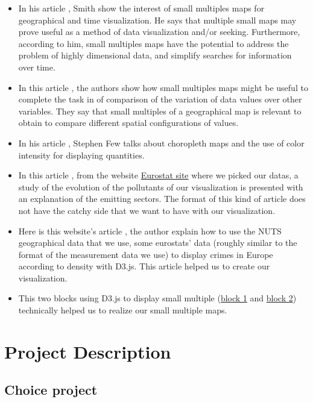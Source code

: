 \documentclass[preprint,journal]{vgtc}       %
\begin{document}
\begin{itemize}[leftmargin=*,parsep=0cm]
\item In his article \cite{Smith:2005:MSM}, Smith show the interest of small multiples maps for geographical and time visualization. He says that multiple small maps may prove useful as a method of data visualization and/or seeking. Furthermore, according to him, small multiples maps have the potential to address the problem of highly dimensional data, and simplify searches for information over time.


\item In this article \cite{Reimer:2011:SSM}, the authors show how small multiples maps might be useful to complete the task in of comparison of the variation of data values over other variables. They say that small multiples of a geographical map is relevant to obtain to compare different spatial configurations of values.

\item In his article \cite{Few:2009:GDV}, Stephen Few talks about choropleth maps and the use of color intensity for displaying quantities.

\item In this article \cite{Eurostats:2016:VMC}, from the website \href{http://ec.europa.eu/}{Eurostat site} where we picked our datas, a study of the evolution of the pollutants of our visualization is presented with an explanation of the emitting sectors. The format of this kind of article does not have the catchy side that we want to have with our visualization.


\item Here is this website's article \cite{Roger:2013:EWD}, the author explain how to use the NUTS geographical data that we use, some eurostats' data (roughly similar to the format of the measurement data we use) to display crimes in Europe according to density with D3.js. This article helped us to create our visualization.

\item This two blocks using D3.js to display small multiple (\href{http://bl.ocks.org/tomgp/9386620}{block 1} and \href{https://bl.ocks.org/armollica/6314f45890bcaaa45c808b5d2b0c602f}{block 2}) technically helped us to realize our small multiple maps.

\end{itemize}


\section{Project Description}
	\subsection{Choice project}
\end{document}
